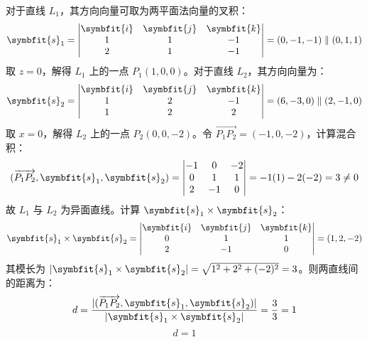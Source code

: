 \begin{solution}
    对于直线 $L_1$，其方向向量可取为两平面法向量的叉积：
    \begin{equation*}
        \symbfit{s}_1 = \begin{vmatrix} \symbfit{i} & \symbfit{j} & \symbfit{k} \\ 1 & 1 & -1 \\ 2 & 1 & -1 \end{vmatrix} = (0, -1, -1) \parallel (0, 1, 1)
    \end{equation*}
    取 $z = 0$，解得 $L_1$ 上的一点 $P_1(1, 0, 0)$。对于直线 $L_2$，其方向向量为：
    \begin{equation*}
        \symbfit{s}_2 = \begin{vmatrix} \symbfit{i} & \symbfit{j} & \symbfit{k} \\ 1 & 2 & -1 \\ 1 & 2 & 2 \end{vmatrix} = (6, -3, 0) \parallel (2, -1, 0)
    \end{equation*}
    取 $x = 0$，解得 $L_2$ 上的一点 $P_2(0, 0, -2)$。令 $\overrightarrow{P_1P_2} = (-1, 0, -2)$，计算混合积：
    \begin{equation*}
        (\overrightarrow{P_1P_2}, \symbfit{s}_1, \symbfit{s}_2) = \begin{vmatrix} -1 & 0 & -2 \\ 0 & 1 & 1 \\ 2 & -1 & 0 \end{vmatrix} = -1(1) - 2(-2) = 3 \neq 0
    \end{equation*}
    故 $L_1$ 与 $L_2$ 为异面直线。计算 $\symbfit{s}_1 \times \symbfit{s}_2$：
    \begin{equation*}
        \symbfit{s}_1 \times \symbfit{s}_2 = \begin{vmatrix} \symbfit{i} & \symbfit{j} & \symbfit{k} \\ 0 & 1 & 1 \\ 2 & -1 & 0 \end{vmatrix} = (1, 2, -2)
    \end{equation*}
    其模长为 $|\symbfit{s}_1 \times \symbfit{s}_2| = \sqrt{1^2 + 2^2 + (-2)^2} = 3$。则两直线间的距离为：
    \begin{equation*}
        d = \frac{|(\overrightarrow{P_1P_2}, \symbfit{s}_1, \symbfit{s}_2)|}{|\symbfit{s}_1 \times \symbfit{s}_2|} = \frac{3}{3} = 1
    \end{equation*}
    \begin{equation*}
        \boxed{d = 1}
    \end{equation*}
\end{solution}


